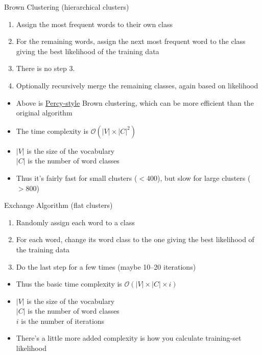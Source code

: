 \documentclass[xcolor=pdftex,x11names,table,hyperref]{beamer}
\begin{document}
\begin{frame}{}
	\hspace*{-19.0em}%
	\scalebox{0.77}{%
		
	}%
\end{frame}


\begin{frame}{Brown Clustering (hierarchical clusters)}
\begin{enumerate}
	\item Assign the most frequent words to their own class
	\pause
	\item For the remaining words, assign the next most frequent word to the class giving the best likelihood of the training data
	\pause
	\item There is no step 3.
	\pause
	\item Optionally recursively merge the remaining classes, again based on likelihood
\end{enumerate}
\pause
\begin{itemize}
	\item Above is \href{http://people.csail.mit.edu/pliang/papers/meng-thesis.pdf}{Percy-style} Brown clustering, which can be more efficient than the original algorithm
	\pause
	\item The time complexity is $\mathcal{O}( |V| \times |C|^2 )$
	\item $|V|$ is the size of the vocabulary \\
	      $|C|$ is the number of word classes \\
	\pause
	\item Thus it's fairly fast for small clusters ($<400$), but slow for large clusters ($>800$)
\end{itemize}
\end{frame}

\begin{frame}{Exchange Algorithm (flat clusters)}
\begin{enumerate}
	\item Randomly assign each word to a class
	\pause
	\item For each word, change its word class to the one giving the best likelihood of the training data
	\pause
	\item Do the last step for a few times (maybe 10--20 iterations)
\end{enumerate}
\pause
\begin{itemize}
	\item Thus the basic time complexity is $\mathcal{O}(|V| \times |C| \times i)$
	\item $|V|$ is the size of the vocabulary \\
	      $|C|$ is the number of word classes \\
	      $i$ is the number of iterations
\pause
	\item There's a little more added complexity is how you calculate training-set likelihood
\end{itemize}
\end{frame}
\end{document}
